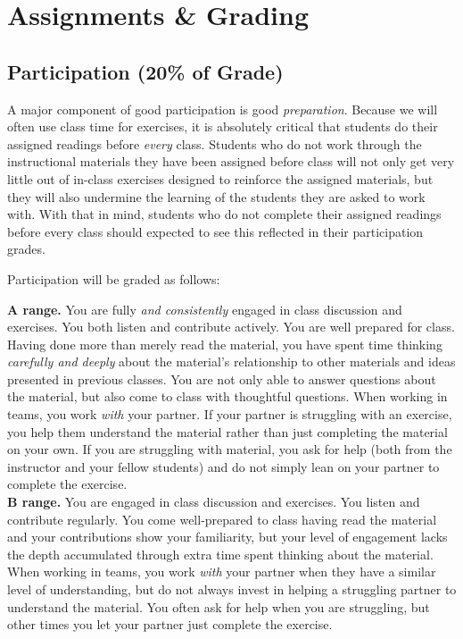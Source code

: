 \documentclass[12pt]{article}
\begin{document}
\section{Assignments \& Grading}

\subsection{Participation (20\% of Grade)}

A major component of good participation is good \emph{preparation}. Because we will often use class time for exercises, it is absolutely critical that students do their assigned readings before \emph{every} class. Students who do not work through the instructional materials they have been assigned before class will not only get very little out of in-class exercises designed to reinforce the assigned materials, but they will also undermine the learning of the students they are asked to work with. With that in mind, students who do not complete their assigned readings before every class should expected to see this reflected in their participation grades.

Participation will be graded as follows:

\textbf{A range.}  You are fully \emph{and consistently} engaged in class discussion and exercises.  You both listen and contribute actively.  You are well prepared for class.  Having done more than merely read the material, you have spent time thinking \emph{carefully and deeply} about the material's relationship to other materials and ideas presented in previous classes. You are not only able to answer questions about the material, but also come to class with thoughtful questions.  When working in teams, you work \emph{with} your partner. If your partner is struggling with an exercise, you help them understand the material rather than just completing the material on your own. If you are struggling with material, you ask for help (both from the instructor and your fellow students) and do not simply lean on your partner to complete the exercise. \\

\textbf{B range.}  You are engaged in class discussion and exercises.  You listen and contribute regularly.  You come well-prepared to class having read the material and your contributions show your familiarity, but your level of engagement lacks the depth accumulated through extra time spent thinking about the material.  When working in teams, you work \emph{with} your partner when they have a similar level of understanding, but do not always invest in helping a struggling partner to understand the material. You often ask for help when you are struggling, but other times you let your partner just complete the exercise. \\
\end{document}
